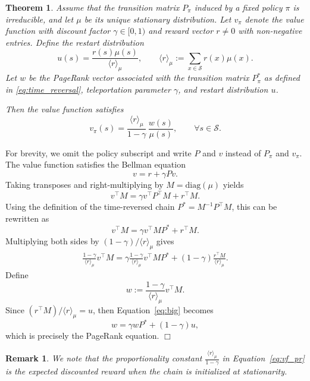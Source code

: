 \documentclass[letterpaper, 10 pt, conference]{ieeeconf}
\newtheorem{remark}{Remark}
\newtheorem{theorem}{Theorem}
\begin{document}
\begin{theorem}
\label{thm:value_pagerank}
Assume that the transition matrix $P_\pi$ induced by a fixed policy $\pi$ is irreducible, and let $\mu$ be its unique stationary distribution.
Let $v_\pi$ denote the value function with discount factor $\gamma\in[0,1)$ and reward vector $r\neq 0$ with non-negative entries.
Define the restart distribution
$$
u(s) = \frac{r(s)\mu(s)}{\langle r \rangle_\mu},
\qquad
\langle r\rangle_\mu := \sum_{x\in\mathcal S} r(x)\mu(x).
$$
Let $w$ be the PageRank vector associated with the transition matrix $P^*_\pi$ as defined in \eqref{eq:time_reversal}, teleportation parameter $\gamma$, and restart distribution $u$.

Then the value function satisfies
\begin{equation}
\label{eq:vf_pr}
v_\pi(s)
=
\frac{\langle r \rangle_\mu}{1-\gamma}\,
\frac{w(s)}{\mu(s)},
\qquad \forall s\in\mathcal S .
\end{equation}
\end{theorem}

For brevity, we omit the policy subscript and write $P$ and $v$ instead of $P_\pi$ and $v_\pi$.
The value function satisfies the Bellman equation
$$
v = r + \gamma P v .
$$
Taking transposes and right-multiplying by $M = \mathrm{diag}(\mu)$ yields
$$
v^\top M=\gamma v^\top P^\top M + r^\top M.
$$
Using the definition of the time-reversed chain $P^* = M^{-1} P^\top M$, this can be rewritten as
$$
v^\top M = \gamma v^\top M P^* + r^\top M .
$$
Multiplying both sides by $(1-\gamma)/\langle r\rangle_\mu$ gives
\begin{align}
\frac{1-\gamma}{\langle r\rangle_\mu} v^\top M
=
\gamma \frac{1-\gamma}{\langle r\rangle_\mu} v^\top M P^*
+
(1-\gamma)\frac{r^\top M}{\langle r\rangle_\mu} .
\label{eq:big}
\end{align}
Define
\begin{equation}
\label{eq:v-to-w}
w := \frac{1-\gamma}{\langle r\rangle_\mu} v^\top M .
\end{equation}
Since $(r^\top M)/\langle r\rangle_\mu = u$, then Equation~\eqref{eq:big} becomes
$$
w = \gamma w P^* + (1-\gamma)u,
$$
which is precisely the PageRank equation. \hfill $\Box$

\begin{remark}
We note that the proportionality constant $\frac{\langle r \rangle_\mu}{1-\gamma}$ in Equation~\eqref{eq:vf_pr} is the expected discounted reward when the chain is initialized at stationarity.
\end{remark}
\end{document}
